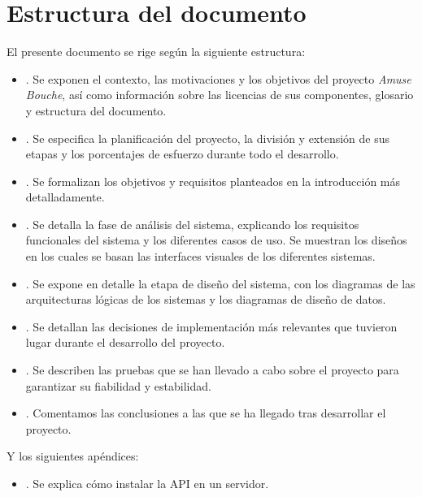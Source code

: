 \section{Estructura del documento}
El presente documento se rige según la siguiente estructura:

\begin{itemize}
\item \textbf{}. Se exponen el contexto, las
  motivaciones y los objetivos del proyecto \textit{Amuse Bouche}, así como
  información sobre las licencias de sus componentes, glosario y estructura del
  documento.

\item \textbf{}. Se especifica la planificación del
  proyecto, la división y extensión de sus etapas y los porcentajes de esfuerzo
  durante todo el desarrollo.

\item \textbf{}. Se formalizan los objetivos y
  requisitos planteados en la introducción más detalladamente.

\item \textbf{}. Se detalla la fase de análisis del
  sistema, explicando los requisitos funcionales del sistema y los diferentes
  casos de uso. Se muestran los diseños en los cuales se basan las interfaces
  visuales de los diferentes sistemas.

\item \textbf{}. Se expone en detalle la etapa de diseño
  del sistema, con los diagramas de las arquitecturas lógicas de los sistemas y
  los diagramas de diseño de datos.

\item \textbf{}. Se detallan las decisiones de
  implementación más relevantes que tuvieron lugar durante el desarrollo del
  proyecto.

\item \textbf{}. Se describen las pruebas que se han
  llevado a cabo sobre el proyecto para garantizar su fiabilidad y estabilidad.

\item \textbf{}. Comentamos las conclusiones a las
  que se ha llegado tras desarrollar el proyecto.
\end{itemize}

Y los siguientes apéndices:
\begin{itemize}
\item \textbf{}. Se explica cómo instalar la
  API en un servidor.
\end{itemize}
